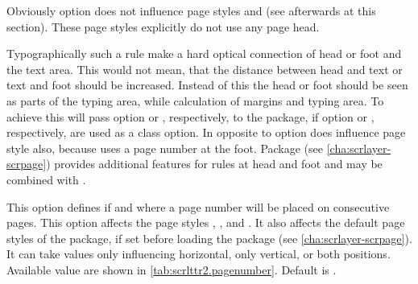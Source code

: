 Obviously option  does not influence page styles
 and  (see afterwards at this
section). These page styles explicitly do not use any page head.

Typographically such a rule make a hard optical connection of head
or foot and the text area. This would not mean, that the distance between head
and text or text and foot should be increased. Instead of this the head or
foot should be seen as parts of the typing area, while calculation of margins
and typing area. To achieve this \KOMAScript{} will pass option
 or , respectively, to the
 package, if option  or
, respectively, are used as a class
option. In opposite to 
option  does influence page style  also,
because  uses a page number at the foot. Package
(see \autoref{cha:scrlayer-scrpage}) provides additional features for rules at
head and foot and may be combined with .%
%
%
%


\begin{Declaration}
\end{Declaration}
%
This option defines if and where a page number will be placed on consecutive
pages. This option affects the page
styles , , and
. It also affects the default page styles of the
 package, if
set before loading the package (see \autoref{cha:scrlayer-scrpage}). It can
take values only influencing horizontal, only vertical, or both
positions. Available value are shown in
\autoref{tab:scrlttr2.pagenumber}. Default is .

